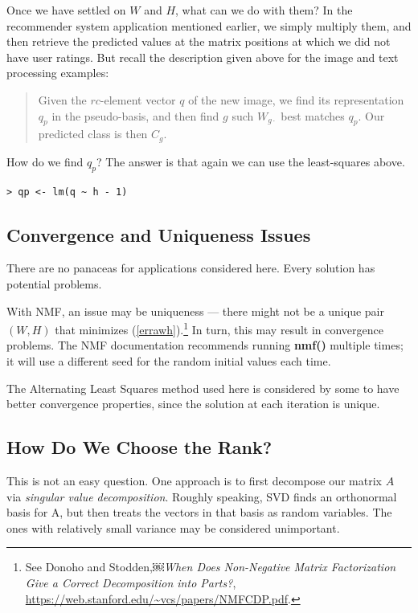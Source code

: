 Once we have settled on $W$ and $H$, what can we do with them?  In the
recommender system application mentioned earlier, we simply multiply
them, and then retrieve the predicted values at the matrix positions at
which we did not have user ratings.  But recall the description given
above for the image and text processing examples: 

\begin{quote}
Given the $rc$-element vector $q$ of the new image, we find
its representation $q_p$ in the pseudo-basis, and then find $g$ such
$W_{g \cdot}$ best matches $q_p$.  Our predicted class is then $C_g$.
\end{quote}

How do we find $q_p$?  The answer is that again we can use the
least-squares above.

\begin{lstlisting}
> qp <- lm(q ~ h - 1)
\end{lstlisting}

\subsection{Convergence and Uniqueness Issues}

There are no panaceas for applications considered here.  Every solution
has potential problems.

With NMF, an issue may be uniqueness --- there might not be a unique
pair $(W,H)$ that minimizes (\ref{errawh}).\footnote{See Donoho and
Stodden,￼{\it When Does Non-Negative Matrix Factorization Give a Correct
Decomposition into Parts?},
\url{https://web.stanford.edu/~vcs/papers/NMFCDP.pdf}.  } In turn, this
may result in convergence problems. The NMF documentation recommends
running {\bf nmf()} multiple times; it will use a different seed for the
random initial values each time.

The Alternating Least Squares method used here is considered by some to
have better convergence properties, since the solution at each iteration
is unique.  

\subsection{How Do We Choose the Rank?}

This is not an easy question.  One approach is to first decompose our
matrix $A$ via {\it singular value decomposition}.  Roughly speaking,
SVD finds an orthonormal basis for A, but then treats the vectors in
that basis as random variables.  The ones with relatively small variance
may be considered unimportant.

